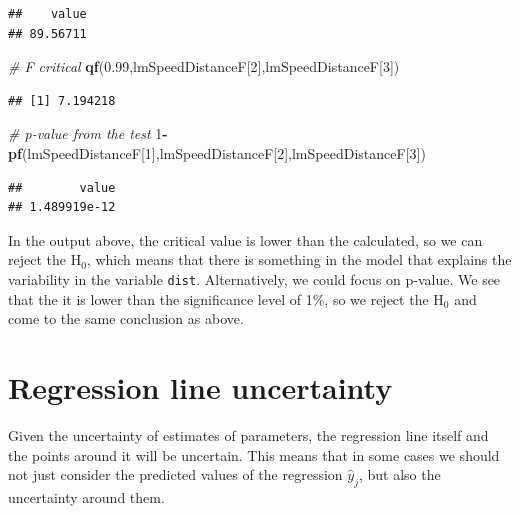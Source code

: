 \documentclass[
]{book}
\newenvironment{Shaded}{\begin{snugshade}}{\end{snugshade}}
\newcommand{\CommentTok}[1]{\textcolor[rgb]{0.56,0.35,0.01}{\textit{#1}}}
\newcommand{\DecValTok}[1]{\textcolor[rgb]{0.00,0.00,0.81}{#1}}
\newcommand{\FloatTok}[1]{\textcolor[rgb]{0.00,0.00,0.81}{#1}}
\newcommand{\KeywordTok}[1]{\textcolor[rgb]{0.13,0.29,0.53}{\textbf{#1}}}
\newcommand{\NormalTok}[1]{#1}
\newcommand{\OperatorTok}[1]{\textcolor[rgb]{0.81,0.36,0.00}{\textbf{#1}}}
\theoremstyle{definition}
\theoremstyle{definition}
\theoremstyle{definition}
\theoremstyle{definition}
\theoremstyle{remark}
\begin{document}
\begin{verbatim}
##    value 
## 89.56711
\end{verbatim}

\begin{Shaded}
\begin{Highlighting}[]
\CommentTok{\# F critical}
\KeywordTok{qf}\NormalTok{(}\FloatTok{0.99}\NormalTok{,lmSpeedDistanceF[}\DecValTok{2}\NormalTok{],lmSpeedDistanceF[}\DecValTok{3}\NormalTok{])}
\end{Highlighting}
\end{Shaded}

\begin{verbatim}
## [1] 7.194218
\end{verbatim}

\begin{Shaded}
\begin{Highlighting}[]
\CommentTok{\# p{-}value from the test}
\DecValTok{1}\OperatorTok{{-}}\KeywordTok{pf}\NormalTok{(lmSpeedDistanceF[}\DecValTok{1}\NormalTok{],lmSpeedDistanceF[}\DecValTok{2}\NormalTok{],lmSpeedDistanceF[}\DecValTok{3}\NormalTok{])}
\end{Highlighting}
\end{Shaded}

\begin{verbatim}
##        value 
## 1.489919e-12
\end{verbatim}

In the output above, the critical value is lower than the calculated, so we can reject the H\(_0\), which means that there is something in the model that explains the variability in the variable \texttt{dist}. Alternatively, we could focus on p-value. We see that the it is lower than the significance level of 1\%, so we reject the H\(_0\) and come to the same conclusion as above.

\hypertarget{regression-line-uncertainty}{%
\section{Regression line uncertainty}\label{regression-line-uncertainty}}

Given the uncertainty of estimates of parameters, the regression line itself and the points around it will be uncertain. This means that in some cases we should not just consider the predicted values of the regression \(\hat{y}_j\), but also the uncertainty around them.
\end{document}
